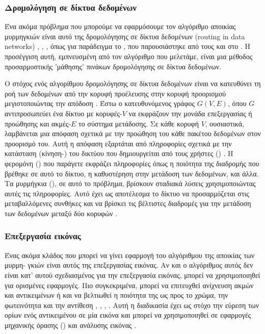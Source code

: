 \subsubsection{Δρομολόγηση σε δίκτυα δεδομένων}
Ένα ακόμα πρόβλημα που μπορούμε να εφαρμόσουμε τον αλγόριθμο αποικίας μυρμηγκιών είναι αυτό της δρομολόγησης σε δίκτυα δεδομένων (routing in data networks) \cite{bertsekas1998network}, \cite{dorigo2003ant}, \cite{di1998antnet}, όπως για παράδειγμα το , που παρουσιάστηκε από τους  και  στο \cite{di1998antnet}. Η προσέγγιση αυτή, εμπνευσμένη από τον αλγόριθμο που μελετάμε, είναι μια μέθοδος προσαρμοστικής 'μάθησης' πινάκων δρομολόγησης σε δίκτυα δεδομένων.

Ο στόχος ενός αλγορίθμου δρομολόγησης σε δίκτυα δεδομένων είναι να κατευθύνει τη ροή των δεδομένων από την κορυφή προέλευσης στην κορυφή προορισμού μεγιστοποιώντας την απόδοση \cite{di1998antnet}. Έστω ο κατευθυνόμενος γράφος $G(V,E)$, όπου $G$ αντιπροσωπεύει ένα δίκτυο με κορυφές-$V$ να εκφράζουν την μονάδα επεξεργασίας ή προώθησης και ακμές-$E$ το σύστημα μετάδοσης. Σε κάθε κορυφή $V$, ουσιαστικά, λαμβάνεται μια απόφαση σχετικά με την προώθηση του κάθε πακέτου δεδομένων στον προορισμό του. Αυτή η απόφαση εξαρτάται από πληροφορίες σχετικά με την κατάσταση (κίνηση-) του δικτύου που δημιουργείται από τους χρήστες () \cite{di1998antnet}. Η φερομόνη () που παράγετε εκφράζει πληροφορίες όπως η ποιότητα της διαδρομής που βρέθηκε σε αυτό το δίκτυο, η καθυστέρηση στην μετάδοση των δεδομένων, και άλλα. Τα μυρμήγκια (), σε αυτό το πρόβλημα, βρίσκουν σταδιακά λύσεις χρησιμοποιώντας αυτές τις πληροφορίες. Αυτό έχει ως αποτέλεσμα το δίκτυο να προσαρμόζεται στις μεταβαλλόμενες συνθήκες και να βρίσκει τις βέλτιστες διαδρομές για την μετάδοση των δεδομένων μεταξύ δύο κορυφών \cite{dorigo2003ant}. 


\subsubsection{Επεξεργασία εικόνας}
Ένας ακόμα κλάδος που μπορεί να γίνει εφαρμογή του αλγόριθμου της αποικίας των μυρμη- γκιών είναι αυτός της επεξεργασίας εικόνας. Αν και ο αλγόριθμος αυτός δεν είναι κατ' αυτού σχεδιασμένος για την επεξεργασία εικόνας, μπορεί να χρησιμοποιηθεί για ορισμένες εφαρμογές. Πιο συγκεκριμένα, μπορεί να επιτευχθεί ανίχνευση ακμών και αντικειμένων ή και να βελτιωθεί η ποιότητα της ως προς το χρώμα, την φωτεινότητα και την αντίθεση \cite{mpikou2013euretikoi}, \cite{nezamabadi2006edge}, \cite{baterina2010image}, \cite{tian2008ant}. Αυτή η διαδικασία έχει ως στόχο την εύρεση των ορίων ενός αντικειμένου σε μία εικόνα και μπορεί να χρησιμοποιηθεί σε εφαρμογές μηχανικής όρασης () και ανάλυσης εικόνας \cite{baterina2010image}. 

